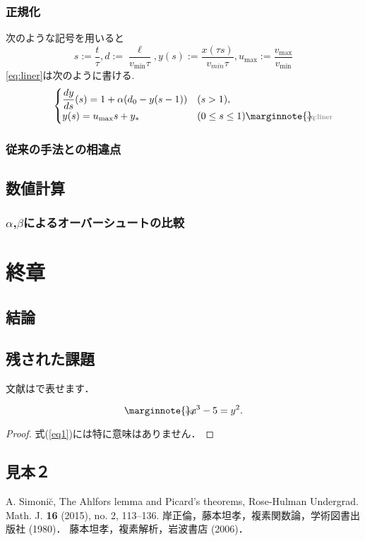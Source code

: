\documentclass[leqno,11pt]{jarticle}
\makeatletter
\let\temp@label\label
\def\label#1{\marginnote{\hbox to 0pt{\scriptsize \textcolor{black!60}{#1}\hss}}\temp@label{#1}\ignorespaces}
\numberwithin{equation}{section}
\theoremstyle{definition} %
\theoremstyle{definition} %
\makeatother
\begin{document}
\subsubsection{正規化}
次のような記号を用いると
\begin{equation}
    s:=\displaystyle\frac{t}{\tau},d:=\frac{\ell}{v_{\min}\tau},
    y(s):=\displaystyle\frac{x(\tau s)}{v_{min}\tau},
    u_{\max}:=\displaystyle\frac{v_{\max}}{v_{\min}}
\end{equation}
\eqref{eq:liner}は次のように書ける.
\begin{equation}\begin{cases}
    \displaystyle\frac{dy}{ds}(s)=1+\alpha(d_0-y(s-1)) &(s>1),\\
    y(s)=u_{\max}s+y_\ast &(0\le s \le 1)\label{eq:liner}
\end{cases}\end{equation}
\subsubsection{従来の手法との相違点}
\subsection{数値計算}
\subsubsection{$\alpha$,$\beta$によるオーバーシュートの比較}
\section{終章}
\subsection{結論}
\subsection{残された課題}
文献は\cite{Si}で表せます．

\begin{equation}\label{eq1}
x^{3}-5=y^{2}. 
\end{equation}
\begin{proof}
式(\ref{eq1})には特に意味はありません．
\end{proof}

\subsection{見本２}

\vspace{1cm}
\begin{thebibliography}{9}
 A. Simoni\u{c}, The Ahlfors lemma and Picard's theorems, 
Rose-Hulman Undergrad. Math. J. {\bf 16} (2015), no. 2, 113--136. 
 岸正倫，藤本坦孝，複素関数論，学術図書出版社 (1980)．
 藤本坦孝，複素解析，岩波書店 (2006)．


\end{thebibliography}
\end{document}
